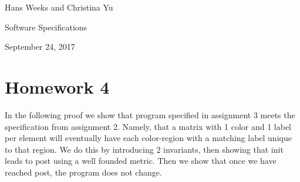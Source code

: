 \documentclass{article}
\begin{document}
\hfill Hans Weeks and Christina Yu

\hfill Software Specifications

\hfill September 24, 2017
\section*{Homework 4}
In the following proof we show that program specified in assignment 3 meets the specification from assignment 2. Namely, that a matrix with 1 color and 1 label per element will eventually have each color-region with a matching label unique to that region. We do this by introducing 2 invariants, then showing that init leads to post using a well founded metric. Then we show that once we have reached post, the program does not change.\\
\end{document}
